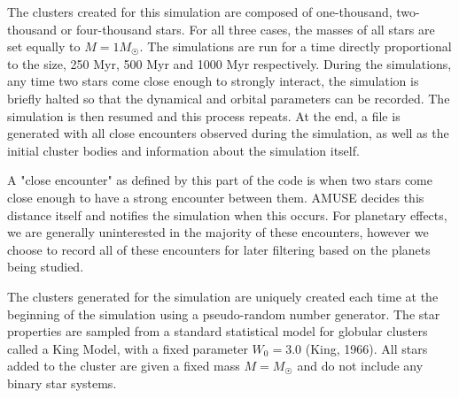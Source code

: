 \documentclass[12pt]{article}
\begin{document}
    The clusters created for this simulation are composed of one-thousand, two-thousand
    or four-thousand stars. For all three cases, the masses of all stars are set equally
    to $M = 1 M_{\astrosun}$. The simulations are run for a time directly proportional
    to the size, 250 Myr, 500 Myr and 1000 Myr respectively.  During the simulations, 
    any time two stars
    come close enough to strongly interact, the simulation is briefly halted so that
    the dynamical and orbital parameters can be recorded. The simulation is then
    resumed and this process repeats. At the end, a file is generated with
    all close encounters observed during the simulation, as well as the initial
    cluster bodies and information about the simulation itself.

    A "close encounter" as defined by this part of the code is when two stars
    come close enough to have a strong encounter between them. AMUSE decides
    this distance itself and notifies the simulation when this occurs. For planetary
    effects, we are generally uninterested in the majority of these encounters, however
    we choose to record all of these encounters for later filtering based on the
    planets being studied.

    The clusters generated for the simulation are uniquely created each time at the
    beginning of the simulation using a pseudo-random number generator. 
    The star properties are sampled from a standard statistical model for globular
    clusters called a
    King Model, with a fixed parameter $W_0=3.0$ (King, 1966).
    All stars added to the cluster are given a fixed mass $M=M_{\astrosun}$ and do not
    include any binary star systems.     
\end{document}
